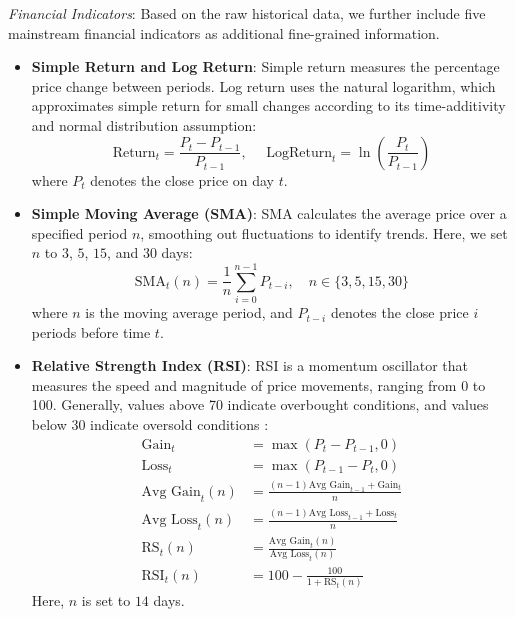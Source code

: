 \documentclass[conference]{IEEEtran}
\begin{document}
\textit{Financial Indicators}: Based on the raw historical data, we further include five mainstream financial indicators as additional fine-grained information. 
\begin{itemize}
    \item {\bf Simple Return and Log Return}: Simple return measures the percentage price change between periods. Log return uses the natural logarithm, which approximates simple return for small changes according to its time-additivity and normal distribution assumption:
    \begin{equation}
    \text{Return}_t = \frac{P_t - P_{t-1}}{P_{t-1}}, \ \ \ \ \ \ \text{LogReturn}_t = \ln\left(\frac{P_t}{P_{t-1}}\right)
    \label{eq:return_formula}
\end{equation}
where $P_t$ denotes the close price on day $t$.
    \item {\bf Simple Moving Average (SMA)}: SMA calculates the average price over a specified period $n$, smoothing out fluctuations to identify trends. Here, we set $n$ to $3$, $5$, $15$, and $30$ days:
    \begin{equation}
    \text{SMA}_t(n) = \frac{1}{n} \sum_{i=0}^{n-1} P_{t-i}, \quad n \in \{3, 5, 15, 30\}
    \label{eq:sma_formula}
\end{equation}
where $n$ is the moving average period, and $P_{t-i}$ denotes the close price $i$ periods before time $t$.
    \item {\bf Relative Strength Index (RSI)}: RSI is a momentum oscillator that measures the speed and magnitude of price movements, ranging from 0 to 100. Generally, values above 70 indicate overbought conditions, and values below 30 indicate oversold conditions \cite{murphy1999technical}:
    \begin{equation}
\begin{aligned}
\text{Gain}_t & = \max(P_t - P_{t-1}, 0) \\
\text{Loss}_t & = \max(P_{t-1} - P_t, 0) \\
\text{Avg Gain}_t(n) & = \frac{(n-1)\text{Avg Gain}_{t-1} + \text{Gain}_t}{n} \\
\text{Avg Loss}_t(n) & = \frac{(n-1)\text{Avg Loss}_{t-1} + \text{Loss}_t}{n} \\
\text{RS}_t(n) & = \frac{\text{Avg Gain}_t(n)}{\text{Avg Loss}_t(n)} \\
\text{RSI}_t(n) & = 100 - \frac{100}{1 + \text{RS}_t(n)}
\label{eq:rsi_formula}
\end{aligned}
\end{equation}
Here, $n$ is set to $14$ days.

\end{itemize}
\end{document}
